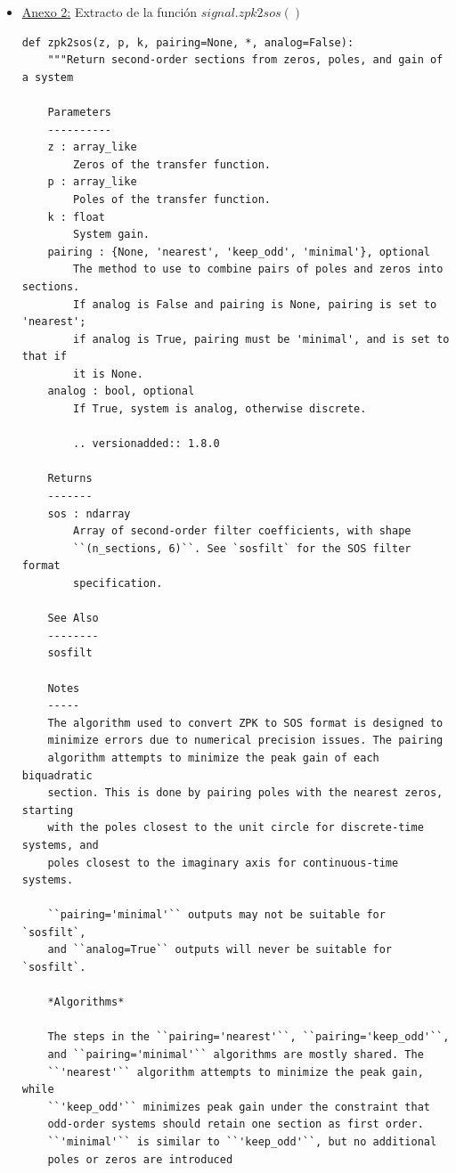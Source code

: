 \documentclass[12pt,a4paper]{article}
\begin{document}
\begin{itemize}
\begin{verbatim}
    # Find discrete equivalent if necessary
    if not analog:
        z, p, k = bilinear_zpk(z, p, k, fs=fs)

    # Transform to proper out type (pole-zero, state-space, numer-denom)
    if output == 'zpk':
        return z, p, k
    elif output == 'ba':
        return zpk2tf(z, p, k)
    elif output == 'sos':
        return zpk2sos(z, p, k, analog=analog)
    \end{verbatim}

    \item \underline{Anexo 2:} Extracto de la función $signal.zpk2sos()$
\begin{verbatim}
def zpk2sos(z, p, k, pairing=None, *, analog=False):
    """Return second-order sections from zeros, poles, and gain of a system

    Parameters
    ----------
    z : array_like
        Zeros of the transfer function.
    p : array_like
        Poles of the transfer function.
    k : float
        System gain.
    pairing : {None, 'nearest', 'keep_odd', 'minimal'}, optional
        The method to use to combine pairs of poles and zeros into sections.
        If analog is False and pairing is None, pairing is set to 'nearest';
        if analog is True, pairing must be 'minimal', and is set to that if
        it is None.
    analog : bool, optional
        If True, system is analog, otherwise discrete.

        .. versionadded:: 1.8.0

    Returns
    -------
    sos : ndarray
        Array of second-order filter coefficients, with shape
        ``(n_sections, 6)``. See `sosfilt` for the SOS filter format
        specification.

    See Also
    --------
    sosfilt

    Notes
    -----
    The algorithm used to convert ZPK to SOS format is designed to
    minimize errors due to numerical precision issues. The pairing
    algorithm attempts to minimize the peak gain of each biquadratic
    section. This is done by pairing poles with the nearest zeros, starting
    with the poles closest to the unit circle for discrete-time systems, and
    poles closest to the imaginary axis for continuous-time systems.

    ``pairing='minimal'`` outputs may not be suitable for `sosfilt`,
    and ``analog=True`` outputs will never be suitable for `sosfilt`.

    *Algorithms*

    The steps in the ``pairing='nearest'``, ``pairing='keep_odd'``,
    and ``pairing='minimal'`` algorithms are mostly shared. The
    ``'nearest'`` algorithm attempts to minimize the peak gain, while
    ``'keep_odd'`` minimizes peak gain under the constraint that
    odd-order systems should retain one section as first order.
    ``'minimal'`` is similar to ``'keep_odd'``, but no additional
    poles or zeros are introduced


\end{verbatim}
\end{itemize}
\end{document}
